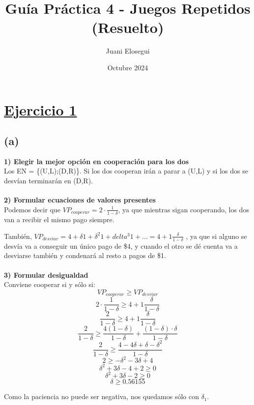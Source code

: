 \documentclass{article}
\title{Guía Práctica 4 - Juegos Repetidos (Resuelto)}
\author{Juani Elosegui}
\date{Octubre 2024}
\begin{document}
    \maketitle

    \section*{\underline{Ejercicio 1}}
        \subsection*{(a)}
            \textbf{1) Elegir la mejor opción en cooperación para los dos}
            \\
            Los EN = \{(U,L);(D,R)\}. Si los dos cooperan irán a parar a (U,L) y si los dos se desvían terminarán en (D,R).
            \\
            \\
            \textbf{2) Formular ecuaciones de valores presentes}
            \\
            Podemos decir que \(VP_{cooperar} = 2 \cdot \frac{1}{1-\delta}\), ya que mientras sigan cooperando, los dos van a recibir el mismo pago siempre.

            También, \(VP_{desviar} = 4 + \delta 1 + \delta^{2} 1 + delta^{3} 1 + \ldots = 4 + 1 \frac{\delta}{1 - \delta}\)
            , ya que si alguno se desvía va a conseguir un único pago de \$4, y cuando el otro se dé cuenta va a desviarse también y condenará al resto a pagos de \$1.
            \\
            \\
            \textbf{3) Formular desigualdad}
            \\
            Conviene cooperar si y sólo si:
            \[VP_{cooperar} \geq VP_{desviar}\]
            \[2 \cdot \frac{1}{1-\delta} \geq 4 + 1\frac{\delta}{1 - \delta}\]
            \[\frac{2}{1 - \delta} \geq 4 + 1 \frac{\delta}{1 - \delta}\]
            \[\frac{2}{1 - \delta} \geq \frac{4(1 - \delta)}{1 - \delta} + \frac{(1 - \delta) \cdot \delta}{1 - \delta}\]
            \[\frac{2}{1 - \delta} \geq \frac{4 - 4\delta + \delta - \delta^{2}}{1 - \delta}\]
            \[2 \geq - \delta^{2} - 3 \delta + 4\]
            \[\delta^{2} + 3 \delta - 4 + 2 \geq 0\]
            \[\delta^{2} + 3 \delta - 2 \geq 0\]
            \[\delta \geq 0.56155\]
 
            Como la paciencia no puede ser negativa, nos quedamos sólo con $\delta_{1}$.
\end{document}
